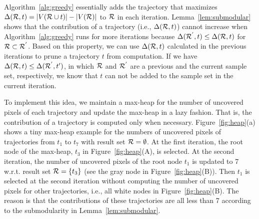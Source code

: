 Algorithm~\ref{alg:greedy} essentially adds the trajectory that maximizes $\Delta(\mathcal{R}, t) = |V(\mathcal{R} \cup t)| - |V(\mathcal{R})|$ to $\mathcal{R}$ in each iteration. Lemma~\ref{lem:submodular} shows that the contribution of a trajectory (i.e., $\Delta(\mathcal{R}, t)$) cannot increase when Algorithm~\ref{alg:greedy} runs for more iterations because $ \Delta(\mathcal{R}^{'}, t) \le \Delta(\mathcal{R}, t) $ for  $\mathcal{R} \subset \mathcal{R}^{'}$. Based on this property, we can use  $\Delta(\mathcal{R}, t)$ calculated in the previous iterations to prune a trajectory $t$ from computation. If we have $\Delta(\mathcal{R}, t)\le \Delta(\mathcal{R}^{'}, t')$, in which $\mathcal{R}$ and $\mathcal{R}^{'}$ are a previous and the current sample set, respectively, we know that $t$ can not be added to the sample set in the current iteration.         

 

To implement this idea, we maintain a max-heap for the number of uncovered pixels of each trajectory and update the max-heap in a lazy fashion. 
That is, the contribution of a trajectory is computed only when necessary.
Figure~\ref{fig:heap}(a) shows a tiny max-heap example for the numbers of uncovered pixels of trajectories from $t_1$ to $t_7$ with result set $\mathcal{R}=\emptyset$.
At the first iteration, the root node of the max-heap, $t_3$ in Figure~\ref{fig:heap}(A), is selected.
At the second iteration, the number of uncovered pixels of the root node $t_1$ is updated to 7 w.r.t. result set $\mathcal{R} = \{t_3 \}$ (see the gray node in Figure~\ref{fig:heap}(B)).
Then $t_1$ is selected at the second iteration without computing the number of uncovered pixels for other trajectories, i.e., all white nodes in Figure~\ref{fig:heap}(B).
The reason is that the contributions of these trajectories are all less than 7 according to the submodularity in Lemma~\ref{lem:submodular}.


%
%


